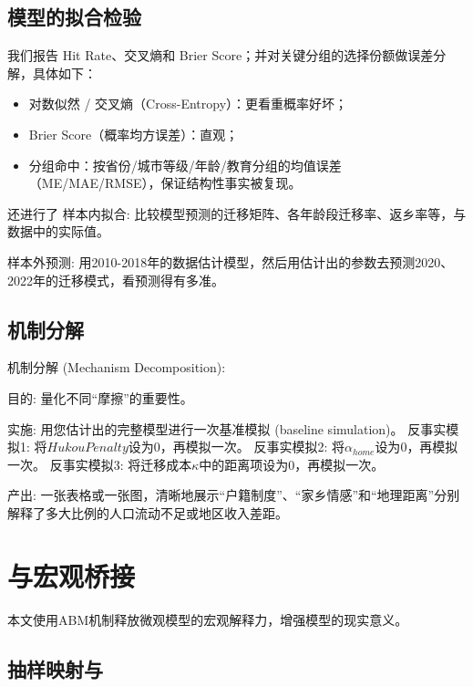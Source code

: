 \documentclass[
  a4paper,
  zihao=-4,
  fontset=mac,
  AutoFakeBold,
  AutoFakeSlant,
  oneside]{ctexbook}
\begin{document}
\section{模型的拟合检验} 


我们报告 Hit Rate、交叉熵和 Brier Score；并对关键分组的选择份额做误差分解，具体如下：
\begin{itemize}
  \item 对数似然 / 交叉熵（Cross-Entropy）：更看重概率好坏；
  \item Brier Score（概率均方误差）：直观；
  \item 分组命中：按省份/城市等级/年龄/教育分组的均值误差（ME/MAE/RMSE），保证结构性事实被复现。
\end{itemize}


还进行了
样本内拟合: 比较模型预测的迁移矩阵、各年龄段迁移率、返乡率等，与数据中的实际值。

样本外预测: 用2010-2018年的数据估计模型，然后用估计出的参数去预测2020、2022年的迁移模式，看预测得有多准。


\section{机制分解} %
\label{sec:机制分解}

机制分解 (Mechanism Decomposition):

目的: 量化不同“摩擦”的重要性。

实施:
用您估计出的完整模型进行一次基准模拟 (baseline simulation)。
反事实模拟1: 将$HukouPenalty$设为$0$，再模拟一次。
反事实模拟2: 将$\alpha_{home}$设为$0$，再模拟一次。
反事实模拟3: 将迁移成本$\kappa$中的距离项设为$0$，再模拟一次。

产出: 一张表格或一张图，清晰地展示“户籍制度”、“家乡情感”和“地理距离”分别解释了多大比例的人口流动不足或地区收入差距。


\chapter{与宏观桥接} %
\label{sec:与宏观桥接}

本文使用ABM机制释放微观模型的宏观解释力，增强模型的现实意义。


\section{抽样映射与} %
\label{sub:抽样映射与}
\end{document}
